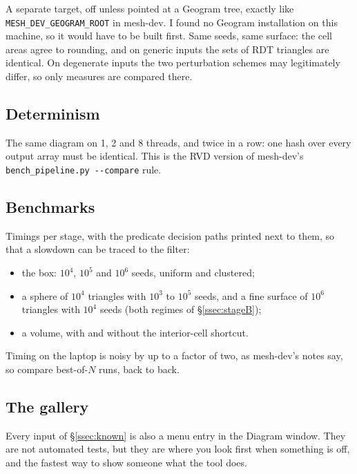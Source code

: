 \documentclass[11pt,a4paper]{article}
\newcommand{\code}[1]{\texttt{#1}}          %
\newcommand{\secref}[1]{\S\ref{#1}}
\begin{document}
A separate target, off unless pointed at a Geogram tree, exactly like \code{MESH\_DEV\_GEOGRAM\_ROOT}
in mesh-dev. I found no Geogram installation on this machine, so it would have to be built
first. Same seeds, same surface: the cell areas agree to rounding, and on generic inputs the sets
of RDT triangles are identical. On degenerate inputs the two perturbation schemes may
legitimately differ, so only measures are compared there.

\subsection{Determinism}\label{ssec:determinismtest}

The same diagram on 1, 2 and 8 threads, and twice in a row: one hash over every output array must
be identical. This is the RVD version of mesh-dev's \code{bench\_pipeline.py -{}-compare} rule.

\subsection{Benchmarks}\label{ssec:bench}

Timings per stage, with the predicate decision paths printed next to them, so that a slowdown can
be traced to the filter:

\begin{itemize}
\item the box: $10^4$, $10^5$ and $10^6$ seeds, uniform and clustered;
\item a sphere of $10^4$ triangles with $10^3$ to $10^5$ seeds, and a fine surface of $10^6$
  triangles with $10^4$ seeds (both regimes of \secref{ssec:stageB});
\item a volume, with and without the interior-cell shortcut.
\end{itemize}

Timing on the laptop is noisy by up to a factor of two, as mesh-dev's notes say, so compare
best-of-$N$ runs, back to back.

\subsection{The gallery}\label{ssec:gallery}

Every input of \secref{ssec:known} is also a menu entry in the Diagram window. They are not
automated tests, but they are where you look first when something is off, and the fastest way to
show someone what the tool does.
\end{document}
